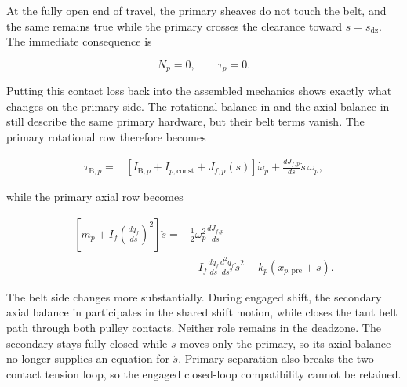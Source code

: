 \documentclass[11pt]{report}
\numberwithin{equation}{section}
\begin{document}
At the fully open end of travel, the primary sheaves do not touch the belt,
and the same remains true while the primary crosses the clearance toward
\(s=s_{\mathrm{dz}}\). The immediate consequence is

\begin{equation}
    N_p=0,
    \qquad
    \tau_p=0.
    \label{eq:deadzone_primary_disengaged}
\end{equation}

Putting this contact loss back into the assembled mechanics shows exactly what
changes on the primary side. The rotational balance in
 and the axial balance in
 still describe the same primary
hardware, but their belt terms vanish. The primary rotational row therefore
becomes

\begin{equation}
\begin{aligned}
    \tau_{\mathrm B,p}
    ={}&
    \left[
        I_{\mathrm B,p}
        +
        I_{p,\mathrm{const}}
        +
        J_{f,p}(s)
    \right]\dot\omega_p
    +
    \frac{dJ_{f,p}}{ds}\dot s\,\omega_p,
\end{aligned}
    \label{eq:deadzone_primary_rotation}
\end{equation}

while the primary axial row becomes

\begin{equation}
\begin{aligned}
    \left[
        m_p
        +
        I_f
        \left(\frac{dq_f}{ds}\right)^2
    \right]\ddot s
    ={}&
    \frac{1}{2}\omega_p^2
    \frac{dJ_{f,p}}{ds}
    \\
    &-
    I_f
    \frac{dq_f}{ds}
    \frac{d^2q_f}{ds^2}
    \dot s^2
    -
    k_p\left(x_{p,\mathrm{pre}}+s\right).
\end{aligned}
    \label{eq:deadzone_primary_axial_motion}
\end{equation}

The belt side changes more substantially. During engaged shift, the secondary
axial balance in  participates
in the shared shift motion, while
 closes the taut belt path through
both pulley contacts. Neither role remains in the deadzone. The secondary
stays fully closed while \(s\) moves only the primary, so its axial balance no
longer supplies an equation for \(\ddot s\). Primary separation also breaks
the two-contact tension loop, so the engaged closed-loop compatibility cannot
be retained.
\end{document}
